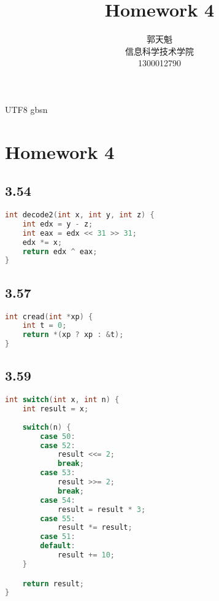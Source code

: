 \documentclass {article}
\begin{document}
  \begin {CJK*} {UTF8} {gbsn}
    \title {\textbf {\Huge Homework 4}}
	\author {郭天魁 \\ 信息科学技术学院 \\ 1300012790}

	\maketitle

  \section{Homework 4}
    \subsection{3.54}
			\begin{lstlisting}[language=C]
int decode2(int x, int y, int z) {
	int edx = y - z;
	int eax = edx << 31 >> 31;
	edx *= x;
	return edx ^ eax;
}
			\end{lstlisting}

		\subsection{3.57}
			\begin{lstlisting}[language=C]
int cread(int *xp) {
	int t = 0;
	return *(xp ? xp : &t);
}
	  	\end{lstlisting}

		\subsection{3.59}
		  \begin{lstlisting}[language=C]
int switch(int x, int n) {
	int result = x;
	
	switch(n) {
		case 50:
		case 52:
			result <<= 2;
			break;
		case 53:
			result >>= 2;
			break;
		case 54:
			result = result * 3;
		case 55:
			result *= result;
		case 51:
		default:
			result += 10;
	}

	return result;
}
			\end{lstlisting}

  \end {CJK*}
\end{document}
